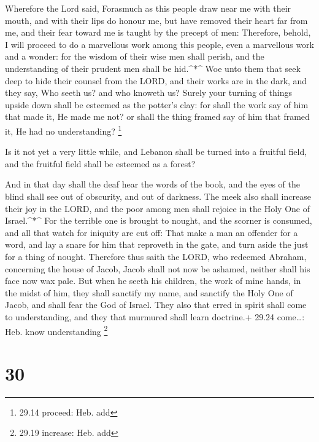  Wherefore the Lord said, Forasmuch as this people draw
near me with their mouth, and with their lips do honour me, but have
removed their heart far from me, and their fear toward me is taught by
the precept of men:  Therefore, behold, I will proceed to
do a marvellous work among this people, even a marvellous work and a
wonder: for the wisdom of their wise men shall perish, and the
understanding of their prudent men shall be hid.\^{}*\^{} 
Woe unto them that seek deep to hide their counsel from the LORD, and
their works are in the dark, and they say, Who seeth us? and who knoweth
us?  Surely your turning of things upside down shall be
esteemed as the potter's clay: for shall the work say of him that made
it, He made me not? or shall the thing framed say of him that framed it,
He had no understanding? \footnote{29.14 proceed: Heb. add}

 Is it not yet a very little while, and Lebanon shall be
turned into a fruitful field, and the fruitful field shall be esteemed
as a forest?

 And in that day shall the deaf hear the words of the book,
and the eyes of the blind shall see out of obscurity, and out of
darkness.  The meek also shall increase their joy in the
LORD, and the poor among men shall rejoice in the Holy One of
Israel.\^{}*\^{}  For the terrible one is brought to
nought, and the scorner is consumed, and all that watch for iniquity are
cut off:  That make a man an offender for a word, and lay a
snare for him that reproveth in the gate, and turn aside the just for a
thing of nought.  Therefore thus saith the LORD, who
redeemed Abraham, concerning the house of Jacob, Jacob shall not now be
ashamed, neither shall his face now wax pale.  But when he
seeth his children, the work of mine hands, in the midst of him, they
shall sanctify my name, and sanctify the Holy One of Jacob, and shall
fear the God of Israel.  They also that erred in spirit
shall come to understanding, and they that murmured shall learn
doctrine.+ 29.24 come\ldots: Heb. know understanding \footnote{29.19
  increase: Heb. add}

\hypertarget{section-29}{%
\section{30}\label{section-29}}


